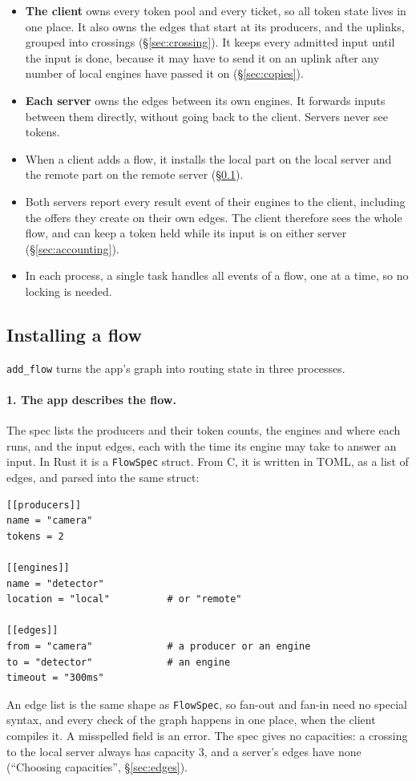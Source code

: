 \documentclass[11pt]{article}
\newcommand{\code}[1]{\texttt{#1}}
\begin{document}
\begin{itemize}[nosep]
  \item \textbf{The client} owns every token pool and every ticket, so all
        token state lives in one place. It also owns the edges that start at
        its producers, and the uplinks, grouped into crossings
        (\S\ref{sec:crossing}). It keeps every admitted input until the input
        is done, because it may have to send it on an uplink after any number
        of local engines have passed it on (\S\ref{sec:copies}).
  \item \textbf{Each server} owns the edges between its own engines. It
        forwards inputs between them directly, without going back to the
        client. Servers never see tokens.
  \item When a client adds a flow, it installs the local part on the local
        server and the remote part on the remote server
        (\S\ref{sec:install}).
  \item Both servers report every result event of their engines to the
        client, including the offers they create on their own edges. The
        client therefore sees the whole flow, and can keep a token held while
        its input is on either server (\S\ref{sec:accounting}).
  \item In each process, a single task handles all events of a flow, one at
        a time, so no locking is needed.
\end{itemize}

\subsection{Installing a flow}
\label{sec:install}

\code{add\_flow} turns the app's graph into routing state in three processes.

\paragraph{1. The app describes the flow.} The spec lists the producers and
their token counts, the engines and where each runs, and the input edges, each
with the time its engine may take to answer an input. In Rust it is a
\code{FlowSpec} struct. From C, it is written in TOML, as a list of edges, and
parsed into the same struct:
\begin{lstlisting}
[[producers]]
name = "camera"
tokens = 2

[[engines]]
name = "detector"
location = "local"          # or "remote"

[[edges]]
from = "camera"             # a producer or an engine
to = "detector"             # an engine
timeout = "300ms"
\end{lstlisting}
An edge list is the same shape as \code{FlowSpec}, so fan-out and fan-in need
no special syntax, and every check of the graph happens in one place, when the
client compiles it. A misspelled field is an error. The spec gives no capacities: a crossing to the local server always
has capacity 3, and a server's edges have none (``Choosing capacities'',
\S\ref{sec:edges}).
\end{document}
